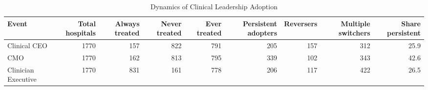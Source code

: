 \begin{table}[!h]
\centering
\caption{Dynamics of Clinical Leadership Adoption}
\centering
\begin{tabular}[t]{lrrrrrrrr}
\toprule
Event & Total hospitals & Always treated & Never treated & Ever treated & Persistent adopters & Reversers & Multiple switchers & Share persistent\\
\midrule
Clinical CEO & 1770 & 157 & 822 & 791 & 205 & 157 & 312 & 25.9\\
CMO & 1770 & 162 & 813 & 795 & 339 & 102 & 343 & 42.6\\
Clinician Executive & 1770 & 831 & 161 & 778 & 206 & 117 & 422 & 26.5\\
\bottomrule
\end{tabular}
\end{table}
